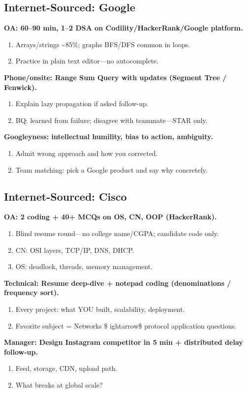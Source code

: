 \documentclass[9pt,a4paper]{article}
\begin{document}
\subsection{Internet-Sourced: Google}
\textbf{OA: 60--90 min, 1--2 DSA on Codility/HackerRank/Google platform.}
\begin{enumerate}[label=\textit{Probe \arabic*:}]
  \item Arrays/strings \textasciitilde{}85\%; graphs BFS/DFS common in loops.
  \item Practice in plain text editor---no autocomplete.
\end{enumerate}
\vspace{2mm}
\textbf{Phone/onsite: Range Sum Query with updates (Segment Tree / Fenwick).}
\begin{enumerate}[label=\textit{Probe \arabic*:}]
  \item Explain lazy propagation if asked follow-up.
  \item BQ: learned from failure; disagree with teammate---STAR only.
\end{enumerate}
\vspace{2mm}
\textbf{Googleyness: intellectual humility, bias to action, ambiguity.}
\begin{enumerate}[label=\textit{Probe \arabic*:}]
  \item Admit wrong approach and how you corrected.
  \item Team matching: pick a Google product and say why concretely.
\end{enumerate}
\vspace{2mm}
\subsection{Internet-Sourced: Cisco}
\textbf{OA: 2 coding + 40+ MCQs on OS, CN, OOP (HackerRank).}
\begin{enumerate}[label=\textit{Probe \arabic*:}]
  \item Blind resume round---no college name/CGPA; candidate code only.
  \item CN: OSI layers, TCP/IP, DNS, DHCP.
  \item OS: deadlock, threads, memory management.
\end{enumerate}
\vspace{2mm}
\textbf{Technical: Resume deep-dive + notepad coding (denominations / frequency sort).}
\begin{enumerate}[label=\textit{Probe \arabic*:}]
  \item Every project: what YOU built, scalability, deployment.
  \item Favorite subject = Networks \$
ightarrow\$ protocol application questions.
\end{enumerate}
\vspace{2mm}
\textbf{Manager: Design Instagram competitor in 5 min + distributed delay follow-up.}
\begin{enumerate}[label=\textit{Probe \arabic*:}]
  \item Feed, storage, CDN, upload path.
  \item What breaks at global scale?
\end{enumerate}
\vspace{2mm}
\end{document}
